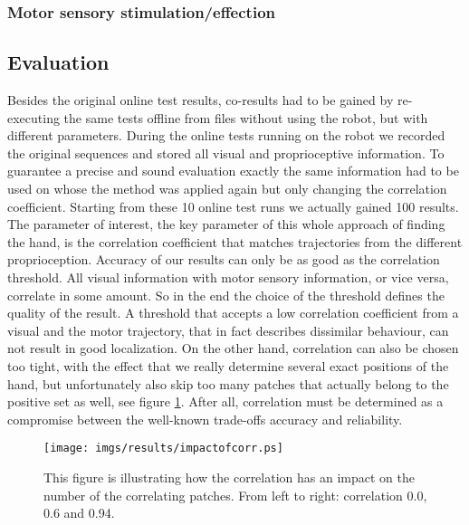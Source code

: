 \documentclass[conference]{IEEEtran}
\begin{document}
\subsubsection{Motor sensory stimulation/effection}\label{results:motosensstim}

%
%
\subsection{Evaluation}\label{results:evaluation}
Besides the original online test results, co-results had to be gained by re-executing the same tests offline from files without using the robot, but with different parameters. During the online tests running on the robot we recorded the original sequences and stored all visual and proprioceptive information. To guarantee a precise and sound evaluation exactly the same information had to be used on whose the method was applied again but only changing the correlation coefficient. Starting from these 10 online test runs we actually gained 100 results. The parameter of interest, the key parameter of this whole approach of finding the hand, is the correlation coefficient that matches trajectories from the different proprioception. Accuracy of our results can only be as good as the correlation threshold. All visual information with motor sensory information, or vice versa, correlate in some amount. So in the end the choice of the threshold defines the quality of the result. A threshold that accepts a low correlation coefficient from a visual and the motor trajectory, that in fact describes dissimilar behaviour, can not result in good localization. On the other hand, correlation can also be chosen too tight, with the effect that we really determine several exact positions of the hand, but unfortunately also skip too many patches that actually belong to the positive set as well, see figure \ref{fig:impactofcorr}. After all, correlation must be determined as a compromise between the well-known trade-offs accuracy and reliability.
%
\begin{figure}
	\begin{center}
		\texttt{[image: imgs/results/impactofcorr.ps]}
			\caption[Varying the correlation threshold.]{ This figure is illustrating how the correlation has an impact on the number of the correlating patches. From left to right: correlation 0.0, 0.6 and 0.94. }
			\label{fig:impactofcorr}
	\end{center}
\end{figure}
%
\end{document}

